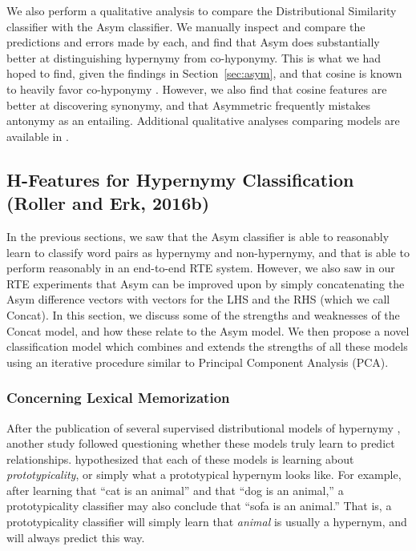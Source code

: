 \documentclass[12pt]{article}
\begin{document}
We also perform a qualitative analysis to compare the Distributional Similarity
classifier with the Asym classifier. We manually inspect and compare the
predictions and errors made by each, and find that Asym does substantially
better at distinguishing hypernymy from co-hyponymy.  This is what we had hoped
to find, given the findings in Section~\ref{sec:asym}, and that cosine is known
to heavily favor co-hyponymy \cite{baroni:2011:gems}.  However, we also find
that cosine features are better at discovering synonymy, and that Asymmetric
frequently mistakes antonymy as an entailing. Additional qualitative analyses
comparing models are available in .

\subsection{H-Features for Hypernymy Classification (Roller and Erk, 2016b)}
\label{sec:hfeatures}

In the previous sections, we saw that the Asym classifier is able to reasonably
learn to classify word pairs as hypernymy and non-hypernymy, and that is able
to perform reasonably in an end-to-end RTE system. However, we also saw in our
RTE experiments that Asym can be improved upon by simply concatenating the Asym
difference vectors with vectors for the LHS and the RHS (which we call Concat).
In this section, we discuss some of the strengths and weaknesses of the Concat
model, and how these relate to the Asym model. We then propose a novel
classification model which combines and extends the strengths of all these
models using an iterative procedure similar to Principal Component Analysis
(PCA).

\subsubsection{Concerning Lexical Memorization}
\label{sec:lexmem}

After the publication of several supervised distributional models of hypernymy
\cite{baroni:2011:gems,fu:2014:acl,roller:2014:coling,weeds:2014:coling},
another study followed questioning whether these models truly learn to predict
relationships.  hypothesized that each of these models
is learning about {\em prototypicality}, or simply what a prototypical
hypernym looks like. For example, after learning that ``cat is an animal''
and that ``dog is an animal,'' a prototypicality classifier may also conclude
that ``sofa is an animal.'' That is, a prototypicality classifier will
simply learn that {\em animal} is usually a hypernym, and will always
predict this way.
\end{document}
